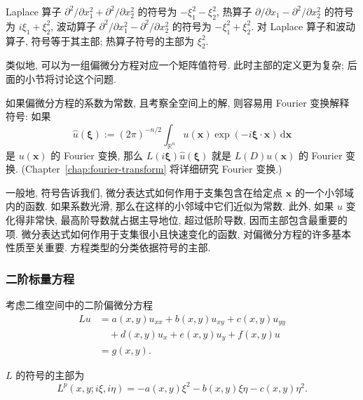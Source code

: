 \begin{Example}
\label{ex:classical-differential-symbols}
Laplace 算子 $\partial^2/\partial x_1^2+\partial^2/\partial x_2^2$ 的符号为 $-\xi_1^2-\xi_2^2$, 热算子 $\partial/\partial x_1-\partial^2/\partial x_2^2$ 的符号为 $i\xi_1+\xi_2^2$, 波动算子 $\partial^2/\partial x_1^2-\partial^2/\partial x_2^2$ 的符号为 $-\xi_1^2+\xi_2^2$. 对 Laplace 算子和波动算子, 符号等于其主部; 热算子符号的主部为 $\xi_2^2$.
\end{Example}

类似地, 可以为一组偏微分方程对应一个矩阵值符号. 此时主部的定义更为复杂; 后面的小节将讨论这个问题.

如果偏微分方程的系数为常数, 且考察全空间上的解, 则容易用 Fourier 变换解释符号: 如果
\begin{equation}\label{eq:classification-fourier-transform}
\hat u(\bm{\xi}):=(2\pi)^{-n/2}\int_{\mathbb{R}^n}u(\bm{x})\exp(-i\bm{\xi}\cdot\bm{x})\,\mathrm{d}\bm{x}
\end{equation}
是 $u(\bm{x})$ 的 Fourier 变换, 那么 $L(i\bm{\xi})\hat u(\bm{\xi})$ 就是 $L(D)u(\bm{x})$ 的 Fourier 变换. (Chapter~\ref{chap:fourier-transform} 将详细研究 Fourier 变换.)

一般地, 符号告诉我们, 微分表达式如何作用于支集包含在给定点 $\bm{x}$ 的一个小邻域内的函数. 如果系数光滑, 那么在这样的小邻域中它们近似为常数. 此外, 如果 $u$ 变化得非常快, 最高阶导数就占据主导地位, 超过低阶导数, 因而主部包含最重要的项. 微分表达式如何作用于支集很小且快速变化的函数, 对偏微分方程的许多基本性质至关重要. 方程类型的分类依据符号的主部.

\subsubsection{二阶标量方程}\label{subsec:second-order-scalar-equations}

考虑二维空间中的二阶偏微分方程
\begin{equation}\label{eq:second-order-scalar-expression}
\begin{aligned}
Lu&=a(x,y)u_{xx}+b(x,y)u_{xy}+c(x,y)u_{yy}\\
&\quad+d(x,y)u_x+e(x,y)u_y+f(x,y)u\\
&=g(x,y).
\end{aligned}
\end{equation}


$L$ 的符号的主部为
\begin{equation}\label{eq:second-order-quadratic-symbol}
L^p(x,y;i\xi,i\eta)=-a(x,y)\xi^2-b(x,y)\xi\eta-c(x,y)\eta^2.
\end{equation}


